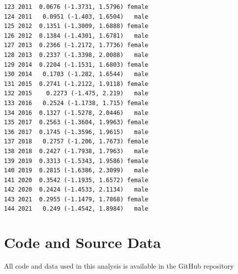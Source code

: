 \documentclass[
  12pt,
]{report}
\begin{document}
\begin{verbatim}
123 2011  0.0676 (-1.3731, 1.5796) female
124 2011   0.0951 (-1.403, 1.6504)   male
125 2012  0.1351 (-1.3009, 1.6888) female
126 2012  0.1384 (-1.4301, 1.6781)   male
127 2013  0.2366 (-1.2172, 1.7736) female
128 2013  0.2337 (-1.3398, 2.0088)   male
129 2014  0.2204 (-1.1531, 1.6803) female
130 2014   0.1703 (-1.282, 1.6544)   male
131 2015  0.2741 (-1.2122, 1.9118) female
132 2015    0.2273 (-1.475, 2.219)   male
133 2016   0.2524 (-1.1738, 1.715) female
134 2016  0.1327 (-1.5278, 2.0446)   male
135 2017  0.2563 (-1.3604, 1.9963) female
136 2017  0.1745 (-1.3596, 1.9615)   male
137 2018   0.2757 (-1.206, 1.7673) female
138 2018  0.2427 (-1.7938, 1.7963)   male
139 2019  0.3313 (-1.5343, 1.9586) female
140 2019  0.2815 (-1.6386, 2.3099)   male
141 2020  0.3542 (-1.1935, 1.6572) female
142 2020  0.2424 (-1.4533, 2.1134)   male
143 2021  0.2955 (-1.1479, 1.7868) female
144 2021   0.249 (-1.4542, 1.8984)   male
\end{verbatim}

\newpage

\section{Code and Source Data}\label{code-and-source-data}

All code and data used in this analysis is available in the GitHub
repository
\end{document}
